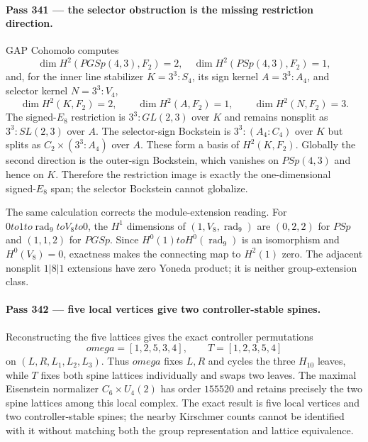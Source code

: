 \documentclass[12pt,a4paper]{article}
\def\mathbb#1{#1}%
\def\mathrm#1{#1}%
\def\mathbf#1{#1}%
\def\omega{omega}%
\def\to{ to }%
\theoremstyle{definition}
\newcommand{\PSp}{\mathrm{PSp}}
\newcommand{\PGSp}{\mathrm{PGSp}}
\newcommand{\FF}{\mathbb{F}}
\newcommand{\GL}{\mathrm{GL}}
\begin{document}
\paragraph{Pass 341 --- the selector obstruction is the missing restriction
direction.}
GAP Cohomolo computes
\[
 \dim H^2(\PGSp(4,3),\FF_2)=2,\quad
 \dim H^2(\PSp(4,3),\FF_2)=1,
\]
and, for the inner line stabilizer $K=3^3:S_4$, its sign kernel
$A=3^3:A_4$, and selector kernel $N=3^3:V_4$,
\[
 \dim H^2(K,\FF_2)=2,\qquad
 \dim H^2(A,\FF_2)=1,\qquad
 \dim H^2(N,\FF_2)=3.
\]
The signed-$E_8$ restriction is $3^3:\GL(2,3)$ over $K$ and remains nonsplit
as $3^3:\mathrm{SL}(2,3)$ over $A$.  The selector-sign Bockstein is
$3^3:(A_4:C_4)$ over $K$ but splits as $C_2\times(3^3:A_4)$ over $A$.
These form a basis of $H^2(K,\FF_2)$.  Globally the second direction is the
outer-sign Bockstein, which vanishes on $\PSp(4,3)$ and hence on $K$.
Therefore the restriction image is exactly the one-dimensional signed-$E_8$
span; the selector Bockstein cannot globalize.

The same calculation corrects the module-extension reading.  For
$0\to\mathbf1\to\operatorname{rad}_9\to V_8\to0$, the $H^1$ dimensions of
$(\mathbf1,V_8,\operatorname{rad}_9)$ are $(0,2,2)$ for $\PSp$ and $(1,1,2)$
for $\PGSp$.  Since $H^0(\mathbf1)\to H^0(\operatorname{rad}_9)$ is an
isomorphism and $H^0(V_8)=0$, exactness makes the connecting map to
$H^2(\mathbf1)$ zero.  The adjacent nonsplit $1|8|1$ extensions have zero
Yoneda product; it is neither group-extension class.

\paragraph{Pass 342 --- five local vertices give two controller-stable
spines.}
Reconstructing the five lattices gives the exact controller permutations
\[
 \omega=[1,2,5,3,4],\qquad T=[1,2,3,5,4]
\]
on $(L,R,L_1,L_2,L_3)$.  Thus $\omega$ fixes $L,R$ and cycles the three
$H_{10}$ leaves, while $T$ fixes both spine lattices individually and swaps two
leaves.  The maximal Eisenstein normalizer $C_6\times U_4(2)$ has order
$155520$ and retains precisely the two spine lattices among this local complex.
The exact result is five local vertices and two controller-stable spines; the
nearby Kirschmer counts cannot be identified with it without matching both the
group representation and lattice equivalence.
\end{document}
